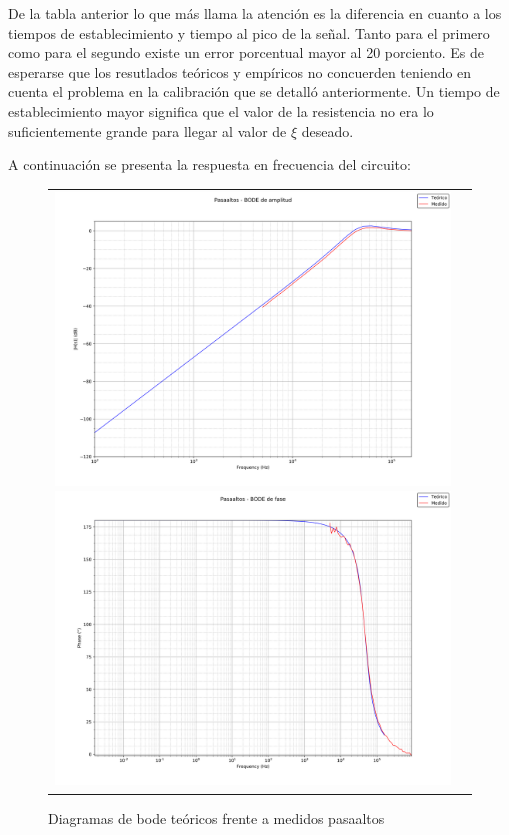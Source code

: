 De la tabla anterior lo que más llama la atención es la diferencia en cuanto a los tiempos de establecimiento y tiempo al pico de la señal. Tanto para el primero como para el segundo existe un error porcentual mayor al 20 porciento. Es de esperarse que los resutlados teóricos y empíricos no concuerden teniendo en cuenta el problema en la calibración que se detalló anteriormente. Un tiempo de establecimiento mayor significa que el valor de la resistencia no era lo suficientemente grande para llegar al valor de $\xi$ deseado.


A continuación se presenta la respuesta en frecuencia del circuito:

\begin{figure}[H]
    \centering
    \begin{tabular}{c c}
        \includegraphics[scale=0.3]{Recursos/ej4/pasaaltos_amplitud.png}
        \includegraphics[scale=0.3]{Recursos/ej4/pasaaltos_fase.png}
    \end{tabular}
    \caption{Diagramas de bode teóricos frente a medidos pasaaltos}
    \label{fig:bode_pasaaltos_comparacion}
\end{figure}

